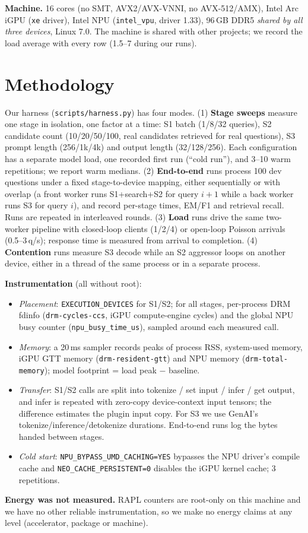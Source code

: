 \documentclass[10pt]{article}
\begin{document}
\textbf{Machine.} 16 cores (no SMT, AVX2/AVX-VNNI, no AVX-512/AMX), Intel Arc iGPU (\texttt{xe} driver),
Intel NPU (\texttt{intel\_vpu}, driver 1.33), 96\,GB DDR5 \emph{shared by all three devices}, Linux 7.0.
The machine is shared with other projects; we record the load average with every row (1.5--7 during our runs).

\section{Methodology}

Our harness (\texttt{scripts/harness.py}) has four modes.
(1) \textbf{Stage sweeps} measure one stage in isolation, one factor at a time: S1 batch (1/8/32 queries),
S2 candidate count (10/20/50/100, real candidates retrieved for real questions), S3 prompt length
(256/1k/4k) and output length (32/128/256). Each configuration has a separate model load, one recorded first
run (``cold run''), and 3--10 warm repetitions; we report warm medians.
(2) \textbf{End-to-end} runs process 100 dev questions under a fixed stage-to-device mapping, either
sequentially or with overlap (a front worker runs S1+search+S2 for query $i{+}1$ while a back worker runs S3 for
query $i$), and record per-stage times, EM/F1 and retrieval recall. Runs are repeated in interleaved rounds.
(3) \textbf{Load} runs drive the same two-worker pipeline with closed-loop clients (1/2/4) or open-loop Poisson
arrivals (0.5--3\,q/s); response time is measured from arrival to completion.
(4) \textbf{Contention} runs measure S3 decode while an S2 aggressor loops on another device, either in a
thread of the same process or in a separate process.

\textbf{Instrumentation} (all without root):
\begin{itemize}
  \item \emph{Placement}: \texttt{EXECUTION\_DEVICES} for S1/S2; for all stages, per-process DRM fdinfo
        (\texttt{drm-cycles-ccs}, iGPU compute-engine cycles) and the global NPU busy counter
        (\texttt{npu\_busy\_time\_us}), sampled around each measured call.
  \item \emph{Memory}: a 20\,ms sampler records peaks of process RSS, system-used memory, iGPU GTT memory
        (\texttt{drm-resident-gtt}) and NPU memory (\texttt{drm-total-}\allowbreak\texttt{memory}); model footprint = load peak $-$ baseline.
  \item \emph{Transfer}: S1/S2 calls are split into tokenize / set input / infer / get output, and infer is
        repeated with zero-copy device-context input tensors; the difference estimates the plugin input copy.
        For S3 we use GenAI's tokenize/inference/detokenize durations. End-to-end runs log the bytes handed between stages.
  \item \emph{Cold start}: \texttt{NPU\_BYPASS\_UMD\_CACHING=YES} bypasses the NPU driver's compile cache and
        \texttt{NEO\_CACHE\_PERSISTENT=0} disables the iGPU kernel cache; 3 repetitions.
\end{itemize}
\textbf{Energy was not measured.} RAPL counters are root-only on this machine and we have no other reliable
instrumentation, so we make no energy claims at any level (accelerator, package or machine).
\end{document}
